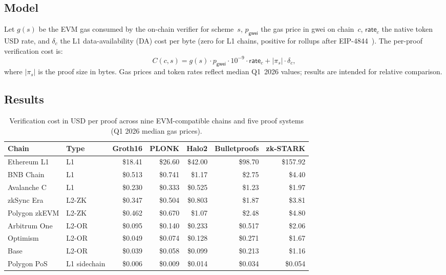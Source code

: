 \documentclass[conference]{IEEEtran}
\begin{document}
\subsection{Model}

Let $g(s)$ be the EVM gas consumed by the on-chain verifier for scheme~$s$,
$p_\mathsf{gwei}$ the gas price in gwei on chain~$c$,
$\mathsf{rate}_c$ the native token USD rate,
and $\delta_c$ the L1 data-availability (DA) cost per byte (zero for L1
chains, positive for rollups after EIP-4844~\cite{EIP4844}).
The per-proof verification cost is:
\begin{equation}
  C(c,s) = g(s) \cdot p_\mathsf{gwei} \cdot 10^{-9} \cdot \mathsf{rate}_c
           + |\pi_s| \cdot \delta_c,
\end{equation}\label{eq:cost}
where $|\pi_s|$ is the proof size in bytes.
Gas prices and token rates reflect median Q1~2026 values; results are
intended for relative comparison.

\subsection{Results}

\begin{table}[t]
\caption{Verification cost in USD per proof across nine EVM-compatible
chains and five proof systems (Q1 2026 median gas prices).}
\label{tab:crosschain}
\centering
\begin{tabular}{llrrrrr}
\toprule
\textbf{Chain} & \textbf{Type}
  & \textbf{Groth16} & \textbf{PLONK} & \textbf{Halo2}
  & \textbf{Bulletproofs} & \textbf{zk-STARK} \\
\midrule
Ethereum L1      & L1           & \$18.41  & \$26.60  & \$42.00  & \$98.70   & \$157.92 \\
BNB Chain        & L1           & \$0.513  & \$0.741  & \$1.17   & \$2.75    & \$4.40   \\
Avalanche C      & L1           & \$0.230  & \$0.333  & \$0.525  & \$1.23    & \$1.97   \\
zkSync Era       & L2-ZK        & \$0.347  & \$0.504  & \$0.803  & \$1.87    & \$3.81   \\
Polygon zkEVM    & L2-ZK        & \$0.462  & \$0.670  & \$1.07   & \$2.48    & \$4.80   \\
Arbitrum One     & L2-OR        & \$0.095  & \$0.140  & \$0.233  & \$0.517   & \$2.06   \\
Optimism         & L2-OR        & \$0.049  & \$0.074  & \$0.128  & \$0.271   & \$1.67   \\
Base             & L2-OR        & \$0.039  & \$0.058  & \$0.099  & \$0.213   & \$1.16   \\
Polygon PoS      & L1 sidechain & \$0.006  & \$0.009  & \$0.014  & \$0.034   & \$0.054  \\
\bottomrule
\end{tabular}
\end{table}
\end{document}
